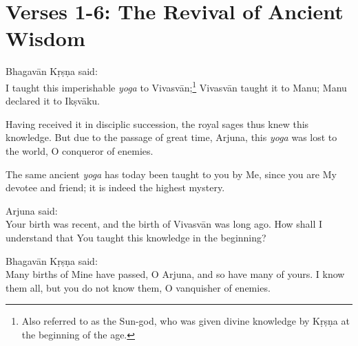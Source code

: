 \newpage
\section{Verses 1-6: The Revival of Ancient Wisdom}\label{sec-verses-1-6-the-revival-of-ancient-wisdom}
{\hspace*{1em}Bhagavān Kṛṣṇa said: \\
I taught this imperishable \textit{yoga} to Vivasvān;\footnote{Also referred to as the Sun-god, who was given divine knowledge by Kṛṣṇa at the beginning of the age.} Vivasvān taught it to Manu; Manu declared it to Ikṣvāku.}

{Having received it in disciplic succession, the royal sages thus knew this knowledge. But due to the passage of great time, Arjuna, this \textit{yoga} was lost to the world, O conqueror of enemies.}

{The same ancient \textit{yoga} has today been taught to you by Me, since you are My devotee and friend; it is indeed the highest mystery.}

{\hspace*{1em}Arjuna said: \\
Your birth was recent, and the birth of Vivasvān was long ago. How shall I understand that You taught this knowledge in the beginning?}

{\hspace*{1em}Bhagavān Kṛṣṇa said: \\
Many births of Mine have passed, O Arjuna, and so have many of yours. I know them all, but you do not know them, O vanquisher of enemies.}

